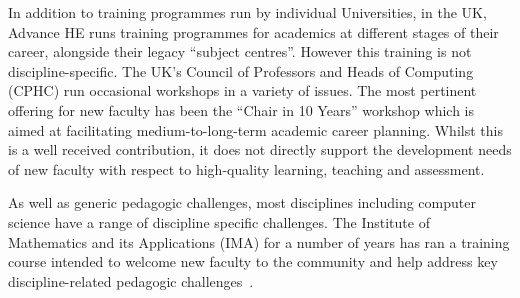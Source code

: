 \documentclass[sigconf]{acmart}
\begin{document}
In addition to training programmes run by individual Universities, in
the UK, Advance HE runs training programmes for academics at different
stages of their career, alongside their legacy ``subject
centres''. However this training is not discipline-specific. The UK's
Council of Professors and Heads of Computing (CPHC) run occasional
workshops in a variety of issues. The most pertinent offering for new
faculty has been the ``Chair in 10 Years'' workshop which is aimed at
facilitating medium-to-long-term academic career planning. Whilst this
is a well received contribution, it does not directly support the
development needs of new faculty with respect to high-quality
learning, teaching and assessment.

As well as generic pedagogic challenges, most disciplines including
computer science have a range of discipline specific challenges. The
Institute of Mathematics and its Applications (IMA) for a number of
years has ran a training course intended to welcome new faculty to the
community and help address key discipline-related pedagogic
challenges~\cite{IMA}.

\end{document}

